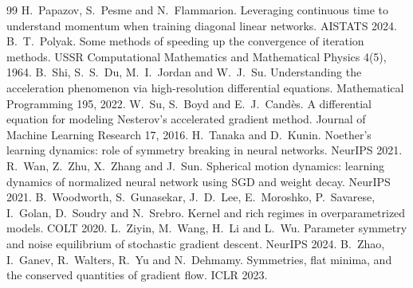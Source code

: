 \documentclass[11pt]{article}
\theoremstyle{remark}
\theoremstyle{definition}
\begin{document}
\begin{thebibliography}{99}
 H.~Papazov, S.~Pesme and N.~Flammarion. Leveraging continuous time to understand momentum when training diagonal linear networks. AISTATS 2024.
 B.~T.~Polyak. Some methods of speeding up the convergence of iteration methods. USSR Computational Mathematics and Mathematical Physics 4(5), 1964.
 B.~Shi, S.~S.~Du, M.~I.~Jordan and W.~J.~Su. Understanding the acceleration phenomenon via high-resolution differential equations. Mathematical Programming 195, 2022.
 W.~Su, S.~Boyd and E.~J.~Cand\`es. A differential equation for modeling Nesterov's accelerated gradient method. Journal of Machine Learning Research 17, 2016.
 H.~Tanaka and D.~Kunin. Noether's learning dynamics: role of symmetry breaking in neural networks. NeurIPS 2021.
 R.~Wan, Z.~Zhu, X.~Zhang and J.~Sun. Spherical motion dynamics: learning dynamics of normalized neural network using SGD and weight decay. NeurIPS 2021.
 B.~Woodworth, S.~Gunasekar, J.~D.~Lee, E.~Moroshko, P.~Savarese, I.~Golan, D.~Soudry and N.~Srebro. Kernel and rich regimes in overparametrized models. COLT 2020.
 L.~Ziyin, M.~Wang, H.~Li and L.~Wu. Parameter symmetry and noise equilibrium of stochastic gradient descent. NeurIPS 2024.
 B.~Zhao, I.~Ganev, R.~Walters, R.~Yu and N.~Dehmamy. Symmetries, flat minima, and the conserved quantities of gradient flow. ICLR 2023.
\end{thebibliography}
\end{document}
